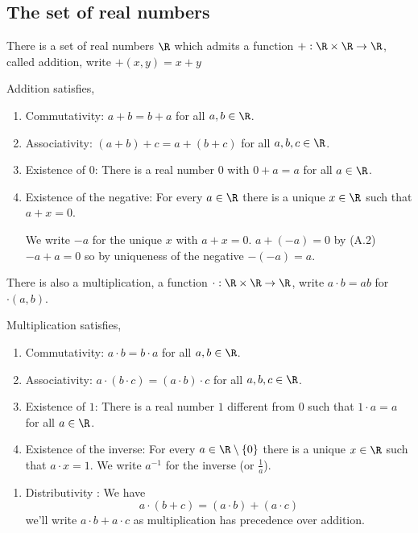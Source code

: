 \documentclass[10pt, a4paper]{article}
\begin{document}
\subsection{The set of real numbers}
There is a set of real numbers $\R$ which admits a function $+: \R \times \R \to \R$, called addition, write $+(x, y) = x + y$

Addition satisfies,
\begin{enumerate}[label = (A.\arabic*)]
    \item Commutativity: $a + b = b + a$ for all $a, b \in \R$.
    \item Associativity: $(a + b) + c = a + (b + c)$ for all $a, b, c \in \R$.
    \item Existence of $0$: There is a real number $0$ with $0 + a = a$ for all $a \in \R$.
    \item Existence of the negative: For every $a \in \R$ there is a unique $x \in \R$ such that $a + x = 0$.
    
    We write $-a$ for the unique $x$ with $a + x = 0$. $a + (-a) = 0$ by (A.2) $-a + a = 0$ so by uniqueness of the negative $-(-a) = a$.
\end{enumerate}

There is also a multiplication, a function $\cdot: \R \times \R \to \R$, write $a \cdot b = ab$ for $\cdot(a, b)$.

Multiplication satisfies,
\begin{enumerate}[label = (M.\arabic*)]
    \item Commutativity: $a \cdot b = b \cdot a$ for all $a, b \in \R$.
    \item Associativity: $a \cdot (b \cdot c) = (a \cdot b) \cdot c$ for all $a, b, c \in \R$.
    \item Existence of $1$: There is a real number $1$ different from $0$ such that $1 \cdot a = a$ for all $a \in \R$.
    \item Existence of the inverse: For every $a \in \R \setminus \{0\}$ there is a unique $x \in \R$ such that $a \cdot x = 1$. We write $a ^ {-1}$ for the inverse (or $\frac{1}{a}$).
\end{enumerate}
\begin{enumerate}[label = (D.\arabic*)]
    \item Distributivity : We have
    \[
    a \cdot (b + c) = (a \cdot b) + (a \cdot c)
    \]
    we'll write $a \cdot b + a\cdot c$ as multiplication has precedence over addition.
\end{enumerate}
\end{document}
